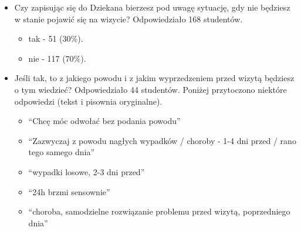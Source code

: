 \documentclass[licencjacka]{pracamgr}
\begin{document}
\begin{itemize}
\item Czy zapisując się do Dziekana bierzesz pod uwagę sytuację, gdy nie będziesz w stanie pojawić się na wizycie?
Odpowiedziało 168 studentów.
\begin{itemize}
\setlength\itemsep{0,1em}

\item tak - 51 (30\%).
\item nie - 117 (70\%).
\end{itemize}

\item Jeśli tak, to z jakiego powodu i z jakim wyprzedzeniem przed wizytą będziesz o tym wiedzieć?
Odpowiedziało 44 studentów. Poniżej przytoczono niektóre odpowiedzi (tekst i pisownia oryginalne).
\begin{itemize}
\setlength\itemsep{0,1em}
\item \enquote{Chcę móc odwołać bez podania powodu}
\item \enquote{Zazwyczaj z powodu nagłych wypadków / choroby - 1-4 dni przed / rano tego samego dnia}
\item \enquote{wypadki losowe, 2-3 dni przed}
\item \enquote{24h brzmi sensownie}
\item \enquote{choroba, samodzielne rozwiązanie problemu przed wizytą, poprzedniego dnia}
\end{itemize}


\end{itemize}
\end{document}
